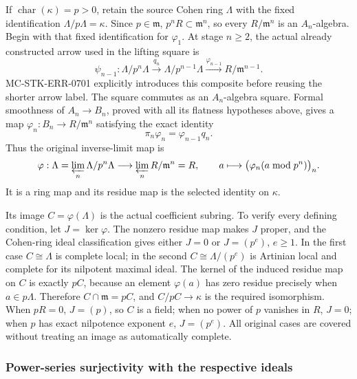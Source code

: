If \(\operatorname{char}(\kappa)=p>0\), retain the source Cohen ring \(\Lambda\) with the fixed identification \(\Lambda/p\Lambda=\kappa\). Since \(p\in\mathfrak m\), \(p^nR\subset\mathfrak m^n\), so every \(R/\mathfrak m^n\) is an \(A_n\)-algebra. Begin with that fixed identification for \(\varphi_1\). At stage \(n\geq2\), the actual already constructed arrow used in the lifting square is \[
 \psi_{n-1}:
 \Lambda/p^n\Lambda
 \xrightarrow{q_n}\Lambda/p^{n-1}\Lambda
 \xrightarrow{\varphi_{n-1}}R/\mathfrak m^{n-1}.
\] MC-STK-ERR-0701 explicitly introduces this composite before reusing the shorter arrow label. The square commutes as an \(A_n\)-algebra square. Formal smoothness of \(A_n\to B_n\), proved with all its flatness hypotheses above, gives a map \(\varphi_n:B_n\to R/\mathfrak m^n\) satisfying the exact identity \[
 \pi_n\varphi_n=\varphi_{n-1}q_n.
\] Thus the original inverse-limit map is \[
 \varphi:\Lambda=\varprojlim_n\Lambda/p^n\Lambda
       \longrightarrow\varprojlim_n R/\mathfrak m^n=R,\qquad
 a\longmapsto\bigl(\varphi_n(a\bmod p^n)\bigr)_n.
\] It is a ring map and its residue map is the selected identity on \(\kappa\).

Its image \(C=\varphi(\Lambda)\) is the actual coefficient subring. To verify every defining condition, let \(J=\ker\varphi\). The nonzero residue map makes \(J\) proper, and the Cohen-ring ideal classification gives either \(J=0\) or \(J=(p^e)\), \(e\geq1\). In the first case \(C\cong\Lambda\) is complete local; in the second \(C\cong\Lambda/(p^e)\) is Artinian local and complete for its nilpotent maximal ideal. The kernel of the induced residue map on \(C\) is exactly \(pC\), because an element \(\varphi(a)\) has zero residue precisely when \(a\in p\Lambda\). Therefore \(C\cap\mathfrak m=pC\), and \(C/pC\to\kappa\) is the required isomorphism. When \(pR=0\), \(J=(p)\), so \(C\) is a field; when no power of \(p\) vanishes in \(R\), \(J=0\); when \(p\) has exact nilpotence exponent \(e\), \(J=(p^e)\). All original cases are covered without treating an image as automatically complete.

\subsubsection{Power-series surjectivity with the respective ideals}\label{algebra-proof-065-power-series-surjectivity-with-the-respective-ideals}

